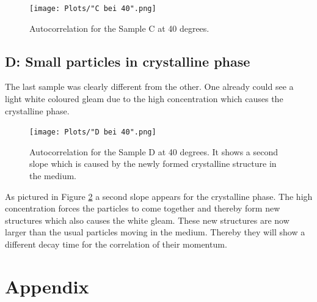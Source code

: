 \documentclass[]{article}
\begin{document}
\begin{figure}[!htbp]
\centering
\texttt{[image: Plots/"C bei 40".png]}
\caption{Autocorrelation for the Sample C at 40 degrees.}
\label{C}
\end{figure}


\newpage
\subsection{D: Small particles in crystalline phase}
The last sample was clearly different from the other. One already could see a light white coloured gleam due to the high concentration which causes the crystalline phase. 

\begin{figure}[!htbp]
\centering
\texttt{[image: Plots/"D bei 40".png]}
\caption{Autocorrelation for the Sample D at 40 degrees. It shows a second slope which is caused by the newly formed crystalline structure in the medium.}
\label{D}
\end{figure}

As pictured in Figure \ref{D} a second slope appears for the crystalline phase. The high concentration forces the particles to come together and thereby form new structures which also causes the white gleam. These new structures are now larger than the usual particles moving in the medium. Thereby they will show a different decay time for the correlation of their momentum.


\newpage
\section{Appendix}
\end{document}
